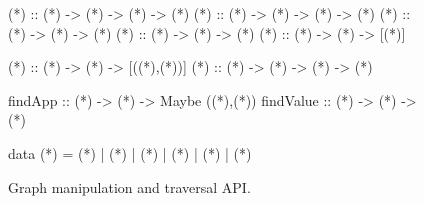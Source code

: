 \begin{figure}[t]
\centering
\begin{mcode}
(*\putBefore*) :: (*\vstate*) -> (*\expr*) -> (*\expr*) -> (*\vstate*)
(*\putAfter*)  :: (*\vstate*) -> (*\expr*) -> (*\expr*) -> (*\vstate*)
(*\putRoot*)   :: (*\vstate*) -> (*\expr*) -> (*\vstate*)
(*\getRoot*)   :: (*\vstate*) -> (*\expr*) -> (*\expr*)
(*\getPath*)      :: (*\tr*) -> (*\expr*) -> [(*\expr*)]

(*\getSubterms*) :: (*\vstate*) -> (*\expr*) -> [((*\expr*),(*\ctx*))]
(*\applyCtx*)    :: (*\vstate*) -> (*\expr*) -> (*\ctx*) -> (*\expr*)

findApp    :: (*\vstate*) -> (*\expr*) -> Maybe ((*\expr*),(*\ctx*))
findValue  :: (*\vstate*) -> (*\expr*) -> (*\expr*)

data (*\cmd*) = (*\stepforwardc*) | (*\stepbackwardc*)
         | (*\jumpforwardc*) | (*\jumpbackwardc*)
         | (*\stepoverc*)    | (*\stepintoc*)
\end{mcode}
\caption{Graph manipulation and traversal API.}
\label{fig:graph-api}
\end{figure}
